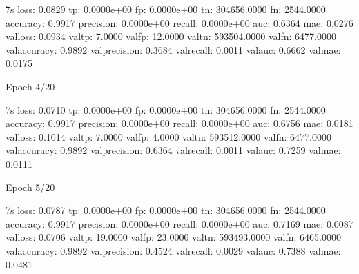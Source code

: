 \documentclass[letterpaper,10pt,english]{sphinxmanual}
\begin{document}
\begin{sphinxVerbatim}[commandchars=\\\{\}]
 \PYGZhy{} 7s \PYGZhy{} loss: 0.0829 \PYGZhy{} tp: 0.0000e+00 \PYGZhy{} fp: 0.0000e+00 \PYGZhy{} tn: 304656.0000 \PYGZhy{} fn: 2544.0000 \PYGZhy{} accuracy: 0.9917 \PYGZhy{} precision: 0.0000e+00 \PYGZhy{} recall: 0.0000e+00 \PYGZhy{} auc: 0.6364 \PYGZhy{} mae: 0.0276 \PYGZhy{} val\PYGZus{}loss: 0.0934 \PYGZhy{} val\PYGZus{}tp: 7.0000 \PYGZhy{} val\PYGZus{}fp: 12.0000 \PYGZhy{} val\PYGZus{}tn: 593504.0000 \PYGZhy{} val\PYGZus{}fn: 6477.0000 \PYGZhy{} val\PYGZus{}accuracy: 0.9892 \PYGZhy{} val\PYGZus{}precision: 0.3684 \PYGZhy{} val\PYGZus{}recall: 0.0011 \PYGZhy{} val\PYGZus{}auc: 0.6662 \PYGZhy{} val\PYGZus{}mae: 0.0175
\end{sphinxVerbatim}

\begin{sphinxVerbatim}[commandchars=\\\{\}]
Epoch 4/20
\end{sphinxVerbatim}

\begin{sphinxVerbatim}[commandchars=\\\{\}]
 \PYGZhy{} 7s \PYGZhy{} loss: 0.0710 \PYGZhy{} tp: 0.0000e+00 \PYGZhy{} fp: 0.0000e+00 \PYGZhy{} tn: 304656.0000 \PYGZhy{} fn: 2544.0000 \PYGZhy{} accuracy: 0.9917 \PYGZhy{} precision: 0.0000e+00 \PYGZhy{} recall: 0.0000e+00 \PYGZhy{} auc: 0.6756 \PYGZhy{} mae: 0.0181 \PYGZhy{} val\PYGZus{}loss: 0.1014 \PYGZhy{} val\PYGZus{}tp: 7.0000 \PYGZhy{} val\PYGZus{}fp: 4.0000 \PYGZhy{} val\PYGZus{}tn: 593512.0000 \PYGZhy{} val\PYGZus{}fn: 6477.0000 \PYGZhy{} val\PYGZus{}accuracy: 0.9892 \PYGZhy{} val\PYGZus{}precision: 0.6364 \PYGZhy{} val\PYGZus{}recall: 0.0011 \PYGZhy{} val\PYGZus{}auc: 0.7259 \PYGZhy{} val\PYGZus{}mae: 0.0111
\end{sphinxVerbatim}

\begin{sphinxVerbatim}[commandchars=\\\{\}]
Epoch 5/20
\end{sphinxVerbatim}

\begin{sphinxVerbatim}[commandchars=\\\{\}]
 \PYGZhy{} 7s \PYGZhy{} loss: 0.0787 \PYGZhy{} tp: 0.0000e+00 \PYGZhy{} fp: 0.0000e+00 \PYGZhy{} tn: 304656.0000 \PYGZhy{} fn: 2544.0000 \PYGZhy{} accuracy: 0.9917 \PYGZhy{} precision: 0.0000e+00 \PYGZhy{} recall: 0.0000e+00 \PYGZhy{} auc: 0.7169 \PYGZhy{} mae: 0.0087 \PYGZhy{} val\PYGZus{}loss: 0.0706 \PYGZhy{} val\PYGZus{}tp: 19.0000 \PYGZhy{} val\PYGZus{}fp: 23.0000 \PYGZhy{} val\PYGZus{}tn: 593493.0000 \PYGZhy{} val\PYGZus{}fn: 6465.0000 \PYGZhy{} val\PYGZus{}accuracy: 0.9892 \PYGZhy{} val\PYGZus{}precision: 0.4524 \PYGZhy{} val\PYGZus{}recall: 0.0029 \PYGZhy{} val\PYGZus{}auc: 0.7388 \PYGZhy{} val\PYGZus{}mae: 0.0481
\end{sphinxVerbatim}
\end{document}
